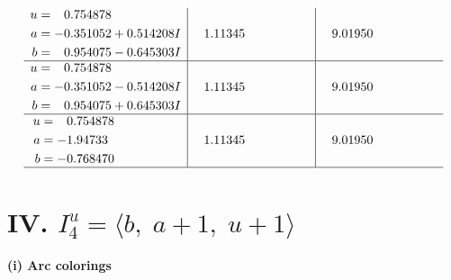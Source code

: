 \documentclass[1p]{elsarticle_modified}
\theoremstyle{definition}
\begin{document}
$$\begin{array}{c|c|c}
\begin{aligned}
u &= \phantom{-}0.754878\phantom{ +0.000000I} \\
a &= -0.351052 + 0.514208 I \\
b &= \phantom{-}0.954075 - 0.645303 I\end{aligned}
 & \phantom{-}1.11345\phantom{ +0.000000I} & \phantom{-}9.01950\phantom{ +0.000000I} \\ \hline\begin{aligned}
u &= \phantom{-}0.754878\phantom{ +0.000000I} \\
a &= -0.351052 - 0.514208 I \\
b &= \phantom{-}0.954075 + 0.645303 I\end{aligned}
 & \phantom{-}1.11345\phantom{ +0.000000I} & \phantom{-}9.01950\phantom{ +0.000000I} \\ \hline\begin{aligned}
u &= \phantom{-}0.754878\phantom{ +0.000000I} \\
a &= -1.94733\phantom{ +0.000000I} \\
b &= -0.768470\phantom{ +0.000000I}\end{aligned}
 & \phantom{-}1.11345\phantom{ +0.000000I} & \phantom{-}9.01950\phantom{ +0.000000I}\\
 \hline 
 \end{array}$$\newpage\newpage\renewcommand{\arraystretch}{1}
\centering \section*{IV. $I^u_{4}= \langle b,\;a+1,\;u+1 \rangle$}
\flushleft \textbf{(i) Arc colorings}\\
\end{document}
